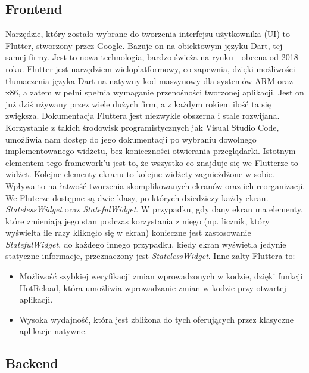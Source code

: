 \subsection{Frontend}
Narzędzie, który zostało wybrane do tworzenia interfejsu użytkownika (UI) to
Flutter, stworzony przez Google. Bazuje on na obiektowym języku Dart, tej samej
firmy. Jest to nowa technologia, bardzo świeża na rynku - obecna od 2018 roku.
Flutter jest narzędziem wieloplatformowy, co zapewnia, dzięki możliwości
tłumaczenia języka Dart na natywny kod maszynowy dla systemów ARM oraz x86, a
zatem w pełni spełnia wymaganie przenośności tworzonej aplikacji. Jest on już
dziś używany przez wiele dużych firm, a z każdym rokiem ilość ta się zwiększa.
Dokumentacja Fluttera jest niezwykle obszerna i stale rozwijana. Korzystanie z
takich środowisk programistycznych jak Visual Studio Code, umożliwia nam dostęp
do jego dokumentacji po wybraniu dowolnego implementowanego widżetu, bez
konieczności otwierania przeglądarki. Istotnym elementem tego framework'u jest
to, że wszystko co znajduje się we Flutterze to widżet. Kolejne elementy ekranu
to kolejne widżety zagnieżdżone w sobie. Wpływa to na łatwość tworzenia
skomplikowanych ekranów oraz ich reorganizacji. We Fluterze dostępne są dwie
klasy, po których dziedziczy każdy ekran. \textit{StatelessWidget} oraz
\textit{StatefulWidget}. W przypadku, gdy dany ekran ma elementy, które
zmieniają jego stan podczas korzystania z niego (np. licznik, który wyświelta
ile razy kliknęło się w ekran) konieczne jest zastosowanie
\textit{StatefulWidget}, do każdego innego przypadku, kiedy ekran wyświetla
jedynie statyczne informacje, przeznaczony jest \textit{StatelessWidget}. Inne
zalty Fluttera to:
\begin{itemize}
    \item Możliwość szybkiej weryfikacji zmian wprowadzonych w kodzie, dzięki
    funkcji HotReload, która umożliwia wprowadzanie zmian w kodzie przy otwartej
    aplikacji.
    \item Wysoka wydajność, która jest zbliżona do tych oferujących przez
    klasyczne aplikacje natywne.
\end{itemize}

\subsection{Backend}
